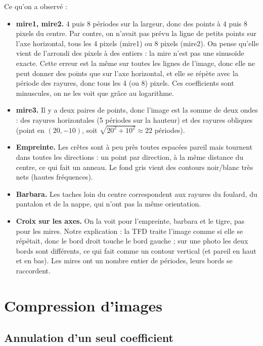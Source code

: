 \documentclass[11pt,a4paper]{article}
\begin{document}
Ce qu'on a observé :
\begin{itemize}
  \item \textbf{mire1, mire2.} 4 puis 8 périodes sur la largeur, donc des points à 4
        puis 8 pixels du centre. Par contre, on n'avait pas prévu la ligne de petits
        points sur l'axe horizontal, tous les 4 pixels (mire1) ou 8 pixels (mire2). On
        pense qu'elle vient de l'arrondi des pixels à des entiers : la mire n'est pas
        une sinusoïde exacte. Cette erreur est la même sur toutes les lignes de
        l'image, donc elle ne peut donner des points que sur l'axe horizontal, et elle
        se répète avec la période des rayures, donc tous les 4 (ou 8) pixels. Ces
        coefficients sont minuscules, on ne les voit que grâce au logarithme.
  \item \textbf{mire3.} Il y a deux paires de points, donc l'image est la somme de
        deux ondes : des rayures horizontales (5 périodes sur la hauteur)
        et des rayures obliques (point en $(20, -10)$, soit
        $\sqrt{20^2 + 10^2} \approx 22$ périodes).
  \item \textbf{Empreinte.} Les crêtes sont à peu près toutes espacées pareil mais
        tournent dans toutes les directions : un point par direction, à la même
        distance du centre, ce qui fait un anneau. Le fond gris vient des contours
        noir/blanc très nets (hautes fréquences).
  \item \textbf{Barbara.} Les taches loin du centre correspondent aux rayures du
        foulard, du pantalon et de la nappe, qui n'ont pas la même orientation.
  \item \textbf{Croix sur les axes.} On la voit pour l'empreinte, barbara et le tigre,
        pas pour les mires. Notre explication : la TFD traite l'image comme si elle se
        répétait, donc le bord droit touche le bord gauche ; sur une photo les deux
        bords sont différents, ce qui fait comme un contour vertical (et pareil en
        haut et en bas). Les mires ont un nombre entier de périodes, leurs bords se
        raccordent.
\end{itemize}

\section{Compression d'images}

\subsection{Annulation d'un seul coefficient}
\end{document}
